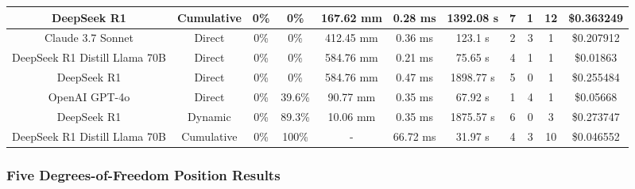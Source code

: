 \begin{landscape}
\begin{table}[H]
\begin{center}
\begin{tabular}{|c|c|c|c|c|c|c|c|c|c|c|}
    \hline
    DeepSeek R1 & Cumulative & 0\% & 0\% & 167.62 mm & 0.28 ms & 1392.08 s & 7 & 1 & 12 & \$0.363249 \\
    \hline
    Claude 3.7 Sonnet & Direct & 0\% & 0\% & 412.45 mm & 0.36 ms & 123.1 s & 2 & 3 & 1 & \$0.207912 \\
    \hline
    DeepSeek R1 Distill Llama 70B & Direct & 0\% & 0\% & 584.76 mm & 0.21 ms & 75.65 s & 4 & 1 & 1 & \$0.01863 \\
    \hline
    DeepSeek R1 & Direct & 0\% & 0\% & 584.76 mm & 0.47 ms & 1898.77 s & 5 & 0 & 1 & \$0.255484 \\
    \hline
    OpenAI GPT-4o & Direct & 0\% & 39.6\% & 90.77 mm & 0.35 ms & 67.92 s & 1 & 4 & 1 & \$0.05668 \\
    \hline
    DeepSeek R1 & Dynamic & 0\% & 89.3\% & 10.06 mm & 0.35 ms & 1875.57 s & 6 & 0 & 3 & \$0.273747 \\
    \hline
    DeepSeek R1 Distill Llama 70B & Cumulative & 0\% & 100\% & - & 66.72 ms & 31.97 s & 4 & 3 & 10 & \$0.046552 \\
    \hline
\end{tabular}
\label{Results-Position-3-6}
\end{center}
\end{table}

\subsubsection{Five Degrees-of-Freedom Position Results}


\end{landscape}
